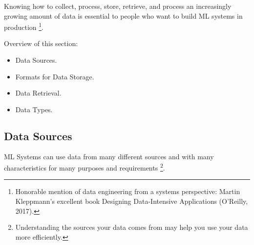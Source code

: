 Knowing how to collect, process, store, retrieve, and process an
increasingly growing amount of data is essential to people who want
to build ML systems in production
\footnote{
    Honorable mention of data engineering from a systems perspective:
    Martin Kleppmann's excellent book Designing Data-Intensive
    Applications (O'Reilly, 2017).
}.

Overview of this section:
\begin{itemize}
    \item Data Sources.
    \item Formats for Data Storage.
    \item Data Retrieval.
    \item Data Types.
\end{itemize}



\subsection{Data Sources}
ML Systems can use data from many different sources and with many
characteristics for many purposes and requirements
\footnote{
    Understanding the sources your data comes from may help you use
    your data more efficiently.
}.

